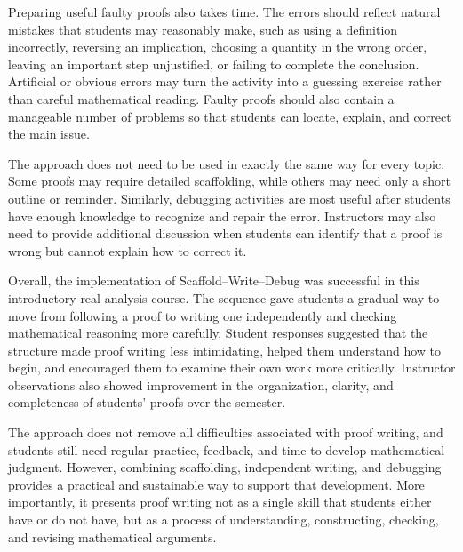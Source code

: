 \documentclass[12pt]{article}
\begin{document}
Preparing useful faulty proofs also takes time. The errors should reflect natural mistakes that students may reasonably make, such as using a definition incorrectly, reversing an implication, choosing a quantity in the wrong order, leaving an important step unjustified, or failing to complete the conclusion. Artificial or obvious errors may turn the activity into a guessing exercise rather than careful mathematical reading. Faulty proofs should also contain a manageable number of problems so that students can locate, explain, and correct the main issue.

The approach does not need to be used in exactly the same way for every topic. Some proofs may require detailed scaffolding, while others may need only a short outline or reminder. Similarly, debugging activities are most useful after students have enough knowledge to recognize and repair the error. Instructors may also need to provide additional discussion when students can identify that a proof is wrong but cannot explain how to correct it.

Overall, the implementation of Scaffold--Write--Debug was successful in this introductory real analysis course. The sequence gave students a gradual way to move from following a proof to writing one independently and checking mathematical reasoning more carefully. Student responses suggested that the structure made proof writing less intimidating, helped them understand how to begin, and encouraged them to examine their own work more critically. Instructor observations also showed improvement in the organization, clarity, and completeness of students' proofs over the semester.

The approach does not remove all difficulties associated with proof writing, and students still need regular practice, feedback, and time to develop mathematical judgment. However, combining scaffolding, independent writing, and debugging provides a practical and sustainable way to support that development. More importantly, it presents proof writing not as a single skill that students either have or do not have, but as a process of understanding, constructing, checking, and revising mathematical arguments.

\printbibliography
\end{document}
